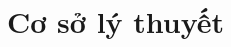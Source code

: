 \documentclass[a4paper,12pt]{report}
\begin{document}


\listoftables
\listoffigures

\chapter{Cơ sở lý thuyết}
\label{Chap_CoSoLyThuyet}

\end{document}
